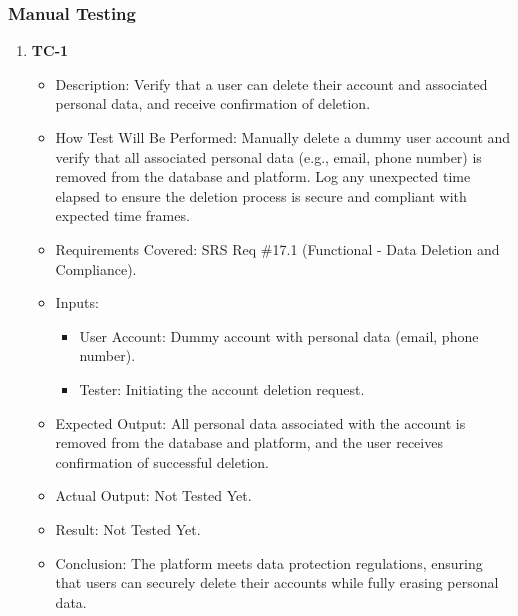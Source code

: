 \documentclass[12pt, titlepage]{article}
\begin{document}
\subsubsection{Manual Testing}
\begin{enumerate}
    \item \textbf{TC-1}  
    \begin{itemize}
        \item Description: Verify that a user can delete their account and associated personal data, and receive confirmation of deletion.
        \item How Test Will Be Performed: Manually delete a dummy user account and verify that all associated personal data (e.g., email, phone number) is removed from the database and platform. Log any unexpected time elapsed to ensure the deletion process is secure and compliant with expected time frames.
        \item Requirements Covered: SRS Req \#17.1 (Functional - Data Deletion and Compliance).
        \item Inputs:  
            \begin{itemize}
                \item User Account: Dummy account with personal data (email, phone number).
                \item Tester: Initiating the account deletion request.
            \end{itemize}
        \item Expected Output: All personal data associated with the account is removed from the database and platform, and the user receives confirmation of successful deletion.
        \item Actual Output: Not Tested Yet.
        \item Result: Not Tested Yet.
        \item Conclusion: The platform meets data protection regulations, ensuring that users can securely delete their accounts while fully erasing personal data.
    \end{itemize}


\end{enumerate}
\end{document}
